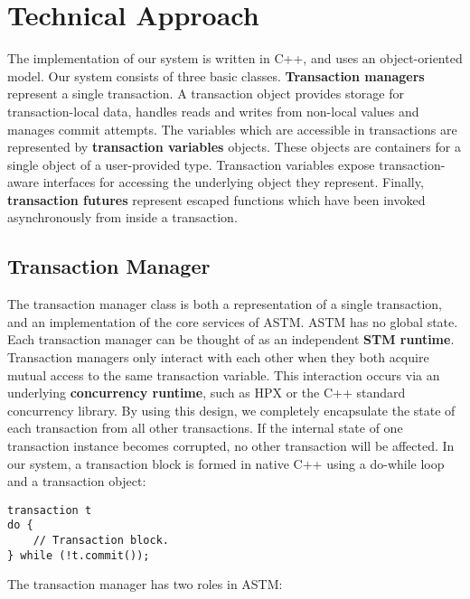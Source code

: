 \documentclass[conference]{IEEEtran}
\begin{document}
\section{Technical Approach}

The implementation of our system is written in C++, and uses an object-oriented model. Our system consists of three basic classes. \textbf{Transaction managers}
represent a single transaction. A transaction object provides storage for transaction-local data, handles reads and writes from non-local values and manages commit attempts. The variables which are accessible in transactions are represented by
\textbf{transaction variables} objects. These objects are containers for a single object of a user-provided type. Transaction variables expose transaction-aware interfaces for accessing the underlying object they represent.
Finally, \textbf{transaction futures} represent escaped functions which have been invoked asynchronously from inside a transaction.

\subsection{Transaction Manager}

The transaction manager class is both a representation of a single transaction, and an implementation of the core services of ASTM. ASTM has no global state. Each transaction manager can be thought of as an independent \textbf{STM runtime}. Transaction managers only interact with each other when they both acquire mutual access to the same transaction variable. This interaction occurs via an underlying \textbf{concurrency runtime}, such as HPX or the C++ standard concurrency library. By using this design, we completely encapsulate the state of each transaction from all other transactions. If the internal state of one transaction instance becomes corrupted, no other transaction will be affected.  In our system, a transaction block is formed in native C++ using a do-while loop and a transaction object:

\begin{lstlisting}
transaction t
do {
    // Transaction block.
} while (!t.commit());
\end{lstlisting}

The transaction manager has two roles in ASTM:
\end{document}
